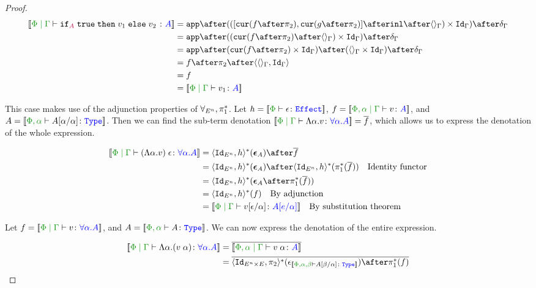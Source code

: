 \documentclass{Report}
\begin{document}
\begin{framed}
\begin{proof}
    \begin{equation}
        \begin{split}
            \deno{\gpetyperelation{\pifthenelse{A}{\t}{v_1}{v_2}}{A}} & = \ifMorph{\inl\after\term{\G}}{f}{g} \\
            & = \app\after((\cur{f\after\pp}\after\term{\G})\times\idg)\after\diag{\G}\\
            & = \app\after(\cur{f\after\pp}\times\idg)\after(\term{\G}\times\idg)\after\diag{\G}\\
            & = f\after\pp\after\pr{\term{\G}}{\idg}\\
            & = f \\
            & = \deno{\gpetyperelation{v_1}{A}}\\
        \end{split}
    \end{equation}
    
    \case{\eqeffbeta}
    This case makes use of the adjunction properties of $\forall_{E^n}, \pi_1^*$. Let  $h = \deno{\typerelation{\P}{\e}{\effect}}$, $f = \deno{\etyperelation{\P,\a}{\G}{v}{A}}$, and $A = \deno{\typerelation{\P,\a}{A\ssub{\a}{\a}}{\type}}$. Then we can find the sub-term denotation $\deno{\gpetyperelation{\elam{\a}{v}}{\all{\a}{A}}} = \bar{f}$, which allows us to express the denotation of the whole expression.
    
    \begin{align*}
        \deno{\gpetyperelation{\eapp{(\elam{\a}{v})}{\e}}{\all{\a}{A}}} & = \pr{\Id{E^n}}{h}\star(\counit{A})\after\bar{f}\\
        & = \pr{\Id{E^n}}{h}\star(\counit{A})\after\pr{\Id{E^n}}{h}\star(\pstar(\bar{f}))\qt{Identity functor}\\
        &= \pr{\Id{E^n}}{h}\star(\counit{A}\after\pstar(\bar{f}))\\
        &= \pr{\Id{E^n}}{h}\star(f)\qt{By adjunction}\\
        &= \deno{\gpetyperelation{v\ssub{\a}{\e}}{A\ssub{\a}{e}}}\qt{By substitution theorem}\\
    \end{align*}
    
    \case{\eqeffeta}
        Let $f  = \deno{\gpetyperelation{v}{\all{\a}{A}}}$, and $A  = \deno{\typerelation{\P,\a}{A}{\type}}$. We can now express the denotation of the entire expression.
    
        \begin{align*}
            \deno{\gpetyperelation{\elam{\a}{(\eapp{v}{\a})}}{\all{\a}{A}}} & = \bar{\deno{\etyperelation{\P,\a}{\G}{\eapp{v}{\a}}{A}}} \\
            & = \bar{\pr{\Id{E^n\times E}}{\pp}\star(\e_{\deno{\typerelation{\P,\a,\b}{A\ssub{\a}{\b}}{\type}}})\after\pstar(f)}
        \end{align*}
    

\end{proof}
\end{framed}
\end{document}
